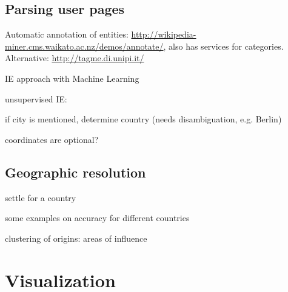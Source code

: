 \subsection{Parsing user pages}

\begin{todos}
\item Automatic annotation of entities: \url{http://wikipedia-miner.cms.waikato.ac.nz/demos/annotate/}, also has services for categories. Alternative: \url{http://tagme.di.unipi.it/}
    \item IE approach with Machine Learning 
    \item unsupervised IE: 
    \item if city is mentioned, determine country (needs disambiguation, e.g. Berlin)
    \item coordinates are optional?
\end{todos}



\subsection{Geographic resolution}\label{sub:resolution}

\begin{todos}
    \item settle for a country
    \item some examples on accuracy for different countries
    \item clustering of origins: areas of influence
\end{todos}


\section{Visualization}



